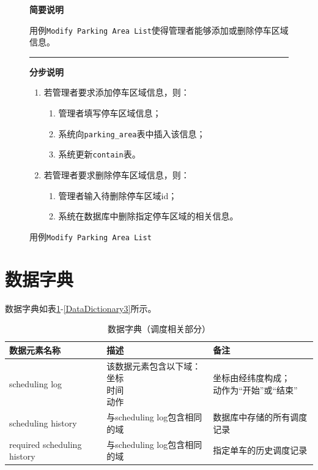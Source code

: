 \begin{figure}
    \centering
 \begin{mdframed}[leftmargin=0pt, rightmargin=0pt]
    \textbf{简要说明}

    用例\texttt{Modify Parking Area List}使得管理者能够添加或删除停车区域信息。

\noindent\rule{\textwidth}{0.5pt} %
    \textbf{分步说明}

    \begin{enumerate}
        \item 若管理者要求添加停车区域信息，则：
        \begin{enumerate}
            \item 管理者填写停车区域信息；
            \item 系统向\texttt{parking\_area}表中插入该信息；
            \item 系统更新\texttt{contain}表。
        \end{enumerate}
        \item 若管理者要求删除停车区域信息，则：
        \begin{enumerate}
            \item 管理者输入待删除停车区域id；
            \item 系统在数据库中删除指定停车区域的相关信息。
        \end{enumerate}
    \end{enumerate}
\end{mdframed}   
\caption{用例\texttt{Modify Parking Area List}}\label{ModifyParkingAreaList}
\end{figure}

\section{数据字典}
数据字典如表\ref{DataDictionary1}-\ref{DataDictionary3}所示。
\begin{table}
\centering
\caption{数据字典（调度相关部分）}
\label{DataDictionary1}
\begin{tabular}{lll}\toprule
  数据元素名称&描述&备注\\\midrule
scheduling log            &
   \makecell[l]{
    该数据元素包含以下域：\\
    \quad 坐标\\
    \quad 时间\\
    \quad 动作\\
    }                &\makecell[l]{坐标由经纬度构成；\\动作为“开始”或“结束”}              \\
scheduling history&与scheduling log包含相同的域&数据库中存储的所有调度记录\\
required scheduling history&与scheduling log包含相同的域&指定单车的历史调度记录\\
 \bottomrule
\end{tabular}
\end{table}

